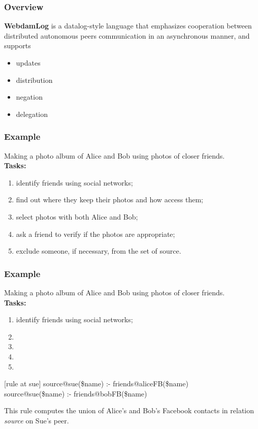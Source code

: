 \documentclass{beamer}
\begin{document}
\frame
{
	\frametitle{Overview}
	
	\textbf{WebdamLog} is a datalog-style language that emphasizes cooperation between distributed autonomous peers communication in an asynchronous manner, and supports
	\begin{itemize}
		\item updates
		\item distribution
		\item negation
		\item delegation
	\end{itemize}	
}


\frame
{
	\frametitle{Example}
	
	Making a photo album of Alice and Bob using photos of closer friends. \\
	\textbf{Tasks:}
	\begin{enumerate}
		\item identify friends using social networks;
		\item find out where they keep their photos and how access them; 
		\item select photos with both Alice and Bob;
		\item ask a friend to verify if the photos are appropriate;
		\item exclude someone, if necessary, from the set of source.
	\end{enumerate}

	
}

\frame
{
	\frametitle{Example}
	
	Making a photo album of Alice and Bob using photos of closer friends. \\
	\textbf{Tasks:}
	\begin{enumerate}
		\item identify friends using social networks;
		\item 
		\item 
		\item 
		\item 
	\end{enumerate}

	\begin{block}{[rule at sue]}
		source@sue(\$name) :- friends@aliceFB(\$name) \\
		source@sue(\$name) :- friends@bobFB(\$name) \\
	\end{block}

	This rule computes the union of Alice's and Bob's Facebook contacts in relation \textit{source} on Sue's peer.
	
}
\end{document}
